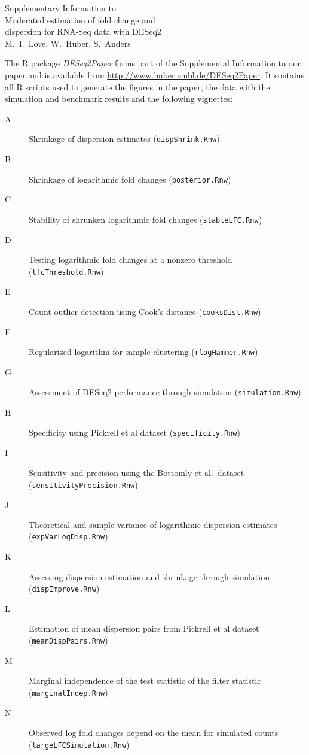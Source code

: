 \documentclass{article}
\makeatletter
\newcommand{\manuallabel}[2]{\def\@currentlabel{#2}\label{#1}}
\makeatother
\begin{document}
\begin{center}
Supplementary Information to\\
\vspace{.5em}
{\Large Moderated estimation of fold change and \\dispersion for RNA-Seq data with
DESeq2}\\
\vspace{1em}
M.\ I.\ Love, W.\ Huber, S.\ Anders
\end{center}
\vspace{4ex}

\noindent The R package \emph{DESeq2Paper} forms part of the Supplemental Information to
our paper and is available from \url{http://www.huber.embl.de/DESeq2Paper}. It contains
all R scripts used to generate the figures in the paper, the data with the simulation
and benchmark results and the following vignettes:

\newcommand\VignetteTOC[3]{%
   \item[#1]{#2 (\texttt{#3.Rnw})}%
   \manuallabel{v:#3}{#1}
} 

\vspace{1em}

\begin{description}
\VignetteTOC{A}{Shrinkage of dispersion estimates}{dispShrink}
\VignetteTOC{B}{Shrinkage of logarithmic fold changes}{posterior}
\VignetteTOC{C}{Stability of shrunken logarithmic fold changes}{stableLFC}
\VignetteTOC{D}{Testing logarithmic fold changes at a nonzero threshold}{lfcThreshold}
\VignetteTOC{E}{Count outlier detection using Cook's distance}{cooksDist}
\VignetteTOC{F}{Regularized logarithm for sample clustering}{rlogHammer}
\VignetteTOC{G}{Assessment of DESeq2 performance through simulation}{simulation}
\VignetteTOC{H}{Specificity using Pickrell et al dataset}{specificity}
\VignetteTOC{I}{Sensitivity and precision using the Bottomly et al.\ dataset}{sensitivityPrecision}
\VignetteTOC{J}{Theoretical and sample variance of logarithmic dispersion estimates}{expVarLogDisp}
\VignetteTOC{K}{Assessing dispersion estimation and shrinkage through simulation}{dispImprove}
\VignetteTOC{L}{Estimation of mean dispersion pairs from Pickrell et al dataset}{meanDispPairs}
\VignetteTOC{M}{Marginal independence of the test statistic of the filter statistic}{marginalIndep}
\VignetteTOC{N}{Observed log fold changes depend on the mean for simulated counts}{largeLFCSimulation}
\end{description}
\end{document}

